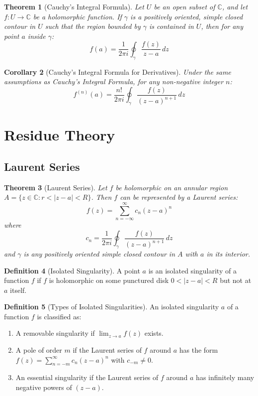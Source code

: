 \documentclass[12pt,a4paper]{article}
\theoremstyle{plain}
\newtheorem{theorem}{Theorem}[section]
\newtheorem{corollary}[theorem]{Corollary}
\theoremstyle{definition}
\newtheorem{definition}[theorem]{Definition}
\begin{document}
\begin{theorem}[Cauchy's Integral Formula]
Let $U$ be an open subset of $\mathbb{C}$, and let $f: U \to \mathbb{C}$ be a holomorphic function. If $\gamma$ is a positively oriented, simple closed contour in $U$ such that the region bounded by $\gamma$ is contained in $U$, then for any point $a$ inside $\gamma$:
\[f(a) = \frac{1}{2\pi i} \oint_{\gamma} \frac{f(z)}{z-a} \, dz\]
\end{theorem}

\begin{corollary}[Cauchy's Integral Formula for Derivatives]
Under the same assumptions as Cauchy's Integral Formula, for any non-negative integer $n$:
\[f^{(n)}(a) = \frac{n!}{2\pi i} \oint_{\gamma} \frac{f(z)}{(z-a)^{n+1}} \, dz\]
\end{corollary}

\section{Residue Theory}

\subsection{Laurent Series}

\begin{theorem}[Laurent Series]
Let $f$ be holomorphic on an annular region $A = \{z \in \mathbb{C} : r < |z-a| < R\}$. Then $f$ can be represented by a Laurent series:
\[f(z) = \sum_{n=-\infty}^{\infty} c_n (z-a)^n\]
where
\[c_n = \frac{1}{2\pi i} \oint_{\gamma} \frac{f(z)}{(z-a)^{n+1}} \, dz\]
and $\gamma$ is any positively oriented simple closed contour in $A$ with $a$ in its interior.
\end{theorem}

\begin{definition}[Isolated Singularity]
A point $a$ is an isolated singularity of a function $f$ if $f$ is holomorphic on some punctured disk $0 < |z-a| < R$ but not at $a$ itself.
\end{definition}

\begin{definition}[Types of Isolated Singularities]
An isolated singularity $a$ of a function $f$ is classified as:
\begin{enumerate}[label=(\roman*)]
\item A removable singularity if $\lim_{z \to a} f(z)$ exists.
\item A pole of order $m$ if the Laurent series of $f$ around $a$ has the form $f(z) = \sum_{n=-m}^{\infty} c_n (z-a)^n$ with $c_{-m} \neq 0$.
\item An essential singularity if the Laurent series of $f$ around $a$ has infinitely many negative powers of $(z-a)$.
\end{enumerate}
\end{definition}
\end{document}
